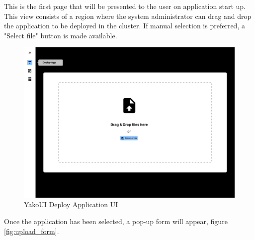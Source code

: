                 This is the first page that will be presented to the user on application start up. This view consists of a region where the system administrator can drag and drop the application to be deployed in the cluster. If manual selection is preferred, a "Select file" button is made available.
                
                \begin{figure}[H]
                    \centering
                    \includegraphics[width=0.7\linewidth]{Images/Frontend/UI/YakoUI Upload Application UI.png}
                    \caption{YakoUI Deploy Application UI}
                    \label{fig:deploy_app_ui}
                \end{figure}
            
                Once the application has been selected, a pop-up form will appear, figure \ref{fig:upload_form}.
                
